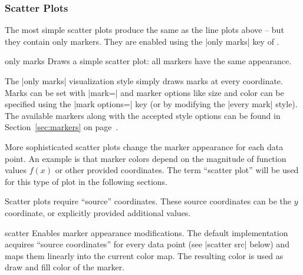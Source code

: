 {\subsubsection{Scatter Plots}
\label{sec:pgfplots:scatter:2d}
The most simple scatter plots produce the same as the line plots above -- but they contain only markers. They are enabled using the |only marks| key of \Tikz.
\begin{plottype}{only marks}
Draws a simple scatter plot: all markers have the same appearance.
\begin{codeexample}[]
\end{codeexample}
	The |only marks| visualization style simply draws marks at every coordinate. Marks can be set with |mark=| and marker options like size and color can be specified using the |mark options=| key (or by modifying the |every mark| style). The available markers along with the accepted style options can be found in Section~\ref{sec:markers} on page~\pageref{sec:markers}.
\end{plottype}

\label{pgfplots:scatter}
More sophisticated scatter plots change the marker appearance for each data point. An example is that marker colors depend on the magnitude of function values $f(x)$ or other provided coordinates. The term ``scatter plot'' will be used for this type of plot in the following sections.

Scatter plots require ``source'' coordinates. These source coordinates can be the $y$ coordinate, or explicitly provided additional values.

\begin{plottype}[/pgfplots]{scatter}
	Enables marker appearance modifications. The default implementation acquires ``source coordinates'' for every data point (see |scatter src| below) and maps them linearly into the current color map. The resulting color is used as draw and fill color of the marker.

\begin{codeexample}[]
\end{codeexample}


\end{plottype}}
